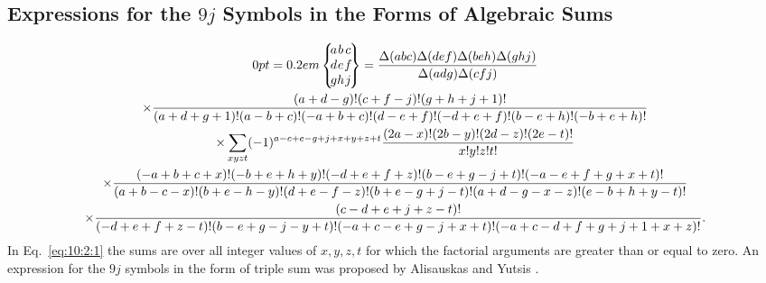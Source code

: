 \subsection{Expressions for the $9 j$ Symbols in the Forms of Algebraic Sums}\label{sec:10.2.1}
\begin{multline}
\ninej{a}{b}{c}{d}{e}{f}{g}{h}{j}=\frac{\Delta(a b c) \Delta(d e f) \Delta(b e h) \Delta(g h j)}{\Delta(a d g) \Delta(c f j)} \\
\times \frac{(a+d-g)!(c+f-j)!(g+h+j+1)!}{(a+d+g+1)!(a-b+c)!(-a+b+c)!(d-e+f)!(-d+e+f)!(b-e+h)!(-b+e+h)!}  \\
\times \sum_{x y z t}(-1)^{a-c+e-g+j+x+y+z+t} \frac{(2 a-x)!(2 b-y)!(2 d-z)!(2 e-t)!}{x!y!z!t!}  \\
\times \frac{(-a+b+c+x)!(-b+e+h+y)!(-d+e+f+z)!(b-e+g-j+t)!(-a-e+f+g+x+t)!}{(a+b-c-x)!(b+e-h-y)!(d+e-f-z)!(b+e-g+j-t)!(a+d-g-x-z)!(e-b+h+y-t)!}  \\
\times \frac{(c-d+e+j+z-t)!}{(-d+e+f+z-t)!(b-e+g-j-y+t)!(-a+c-e+g-j+x+t)!(-a+c-d+f+g+j+1+x+z)!} . \label{eq:10:2:1}
\end{multline}
In Eq.~\eqref{eq:10:2:1} the sums are over all integer values of $x, y, z, t$ for which the factorial arguments are greater than or equal to zero. An expression for the $9 j$ symbols in the form of triple sum was proposed by Alisauskas and Yutsis \cite{ref131}.

